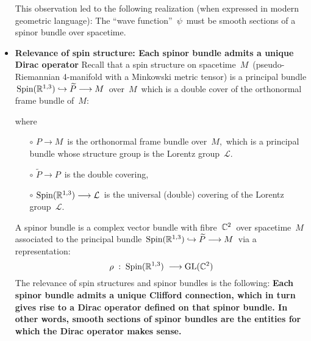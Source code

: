 \begin{itemize}
	This observation led to the following realization (when expressed in modern geometric language):
	The ``wave function'' \,$\psi$\, must be smooth sections of a spinor bundle over spacetime.

\item
	\textbf{Relevance of spin structure: Each spinor bundle admits a unique Dirac operator}
	\vskip 0.01cm
	Recall that a spin structure on spacetime \,$M$\, 
	(pseudo-Riemannian 4-manifold with a Minkowski metric tensor)
	is a principal bundle 
	\,$\textnormal{Spin}(\Re^{1,3})  \hookrightarrow \widetilde{P} \longrightarrow M$\,
	over \,$M$\, which is a double cover of the orthonormal frame bundle of \,$M$:
	\begin{center}
	\end{center}
	where
	\begin{itemize}
	\item[$\circ$]
		$P \longrightarrow M$\, is the orthonormal frame bundle over \,$M$,\,
		which is a principal bundle whose structure group is the Lorentz group \,$\mathcal{L}$.\,
	\item[$\circ$]
		$\widetilde{P} \longrightarrow P$\, is the double covering,
	\item[$\circ$]
		$\textnormal{Spin}(\Re^{1,3}) \longrightarrow \mathcal{L}$\,
		is the universal (double) covering of the Lorentz group \,$\mathcal{L}$.
	\end{itemize}
	A spinor bundle is a complex vector bundle with fibre \,$\C^{2}$\, over spacetime \,$M$\, 
	associated to the principal bundle
	\,$\textnormal{Spin}(\Re^{1,3})  \hookrightarrow \widetilde{P} \longrightarrow M$\,
	via a representation:
	\begin{equation*}
	\rho \; : \; \textnormal{Spin}(\Re^{1,3}) \; \longrightarrow \textnormal{GL}(\C^{2})
	\end{equation*}
	The relevance of spin structures and spinor bundles is the following:
	\textbf{Each spinor bundle admits a unique Clifford connection, which in turn gives rise to a Dirac operator
	defined on that spinor bundle.
	In other words, smooth sections of spinor bundles are the entities for which the Dirac operator makes sense.}


\end{itemize}
